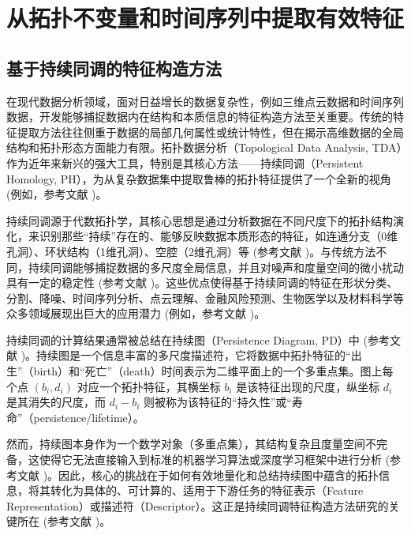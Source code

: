 \section{从拓扑不变量和时间序列中提取有效特征} %
\label{chap:feature_extraction}


    \subsection{基于持续同调的特征构造方法}
        \label{sec:tda_features}
        在现代数据分析领域，面对日益增长的数据复杂性，例如三维点云数据和时间序列数据，开发能够捕捉数据内在结构和本质信息的特征构造方法至关重要。传统的特征提取方法往往侧重于数据的局部几何属性或统计特性，但在揭示高维数据的全局结构和拓扑形态方面能力有限。拓扑数据分析（Topological Data Analysis, TDA）作为近年来新兴的强大工具，特别是其核心方法——持续同调（Persistent Homology, PH），为从复杂数据集中提取鲁棒的拓扑特征提供了一个全新的视角 (例如，参考文献 \cite{source:4, source:26, source:332, source:354, source:510})。

持续同调源于代数拓扑学，其核心思想是通过分析数据在不同尺度下的拓扑结构演化，来识别那些“持续”存在的、能够反映数据本质形态的特征，如连通分支（0维孔洞）、环状结构（1维孔洞）、空腔（2维孔洞）等 (参考文献 \cite{source:34, source:360, source:526})。与传统方法不同，持续同调能够捕捉数据的多尺度全局信息，并且对噪声和度量空间的微小扰动具有一定的稳定性 (参考文献 \cite{source:12})。这些优点使得基于持续同调的特征在形状分类、分割、降噪、时间序列分析、点云理解、金融风险预测、生物医学以及材料科学等众多领域展现出巨大的应用潜力 (例如，参考文献 \cite{source:4, source:14, source:23, source:24, source:25, source:88, source:332, source:510, source:525, source:585})。

持续同调的计算结果通常被总结在持续图（Persistence Diagram, PD）中 (参考文献 \cite{source:11, source:57, source:334})。持续图是一个信息丰富的多尺度描述符，它将数据中拓扑特征的“出生”（birth）和“死亡”（death）时间表示为二维平面上的一个多重点集。图上每个点 $(b_i, d_i)$ 对应一个拓扑特征，其横坐标 $b_i$ 是该特征出现的尺度，纵坐标 $d_i$ 是其消失的尺度，而 $d_i - b_i$ 则被称为该特征的“持久性”或“寿命”（persistence/lifetime）。

然而，持续图本身作为一个数学对象（多重点集），其结构复杂且度量空间不完备，这使得它无法直接输入到标准的机器学习算法或深度学习框架中进行分析 (参考文献 \cite{source:11, source:59, source:88, source:358})。因此，核心的挑战在于如何有效地量化和总结持续图中蕴含的拓扑信息，将其转化为具体的、可计算的、适用于下游任务的特征表示（Feature Representation）或描述符（Descriptor）。这正是持续同调特征构造方法研究的关键所在 (参考文献 \cite{source:88})。

